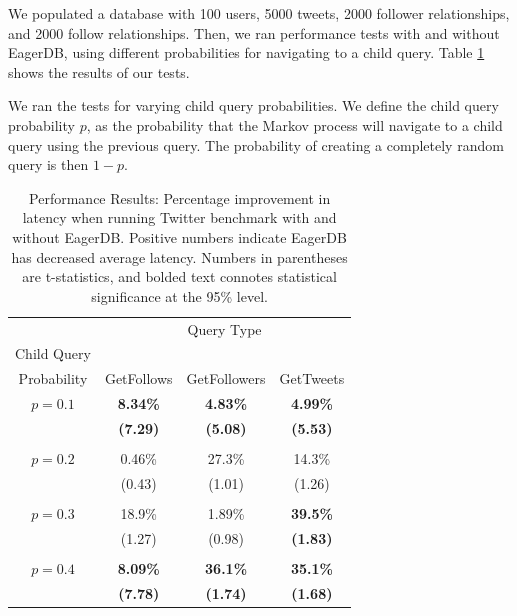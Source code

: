 \documentclass[12pt]{article}
\begin{document}
We populated a database with 100 users, 5000 tweets, 2000 follower relationships, and 2000 follow relationships. Then, we ran performance tests with and without EagerDB, using different probabilities for navigating to a child query. Table \ref{fig:performance-results} shows the results of our tests.

We ran the tests for varying child query probabilities. We define the child query probability $p$, as the probability that the Markov process will navigate to a child query using the previous query. The probability of creating a completely random query is then $1-p$.

\begin{table}[h]
  \centering
  \begin{tabular}{c | c c c }
    & \multicolumn{3}{c}{\large Query Type} \\
                Child Query &                 &                 & \\
                Probability & GetFollows      & GetFollowers    & GetTweets \\
    \hline \hline
                  $p = 0.1$ & \textbf{8.34\%} & \textbf{4.83\%} & \textbf{4.99\%} \\
                            & \textbf{(7.29)} & \textbf{(5.08)} & \textbf{(5.53)} \\
    \\
                  $p = 0.2$ & 0.46\%          & 27.3\%          & 14.3\% \\
                            & (0.43)          & (1.01)          & (1.26) \\
    \\
                  $p = 0.3$ & 18.9\%          & 1.89\%          & \textbf{39.5\%} \\
                            & (1.27)          & (0.98)          & \textbf{(1.83)} \\
    \\
                  $p = 0.4$ & \textbf{8.09\%} & \textbf{36.1\%} & \textbf{35.1\%} \\
                            & \textbf{(7.78)} & \textbf{(1.74)} & \textbf{(1.68)}
  \end{tabular}
  \caption{\label{fig:performance-results}Performance Results: Percentage improvement in latency when running Twitter benchmark with and without EagerDB. Positive numbers indicate EagerDB has decreased average latency. Numbers in parentheses are t-statistics, and bolded text connotes statistical significance at the 95\% level.}
\end{table}
\end{document}

